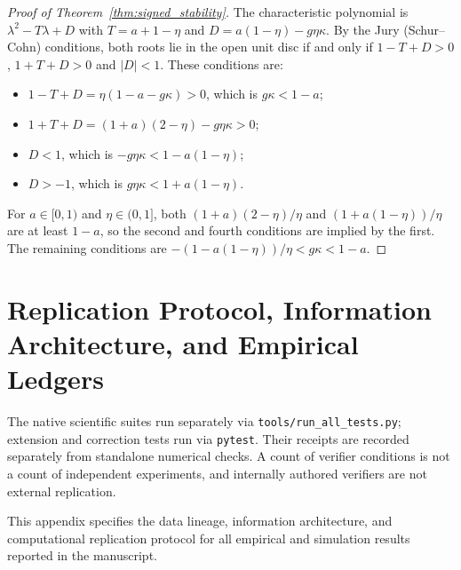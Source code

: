 \documentclass[10pt,twocolumn,letterpaper]{article}
\theoremstyle{definition}
\theoremstyle{remark}
\begin{document}
\begin{proof}[Proof of Theorem~\ref{thm:signed_stability}]
The characteristic polynomial is $\lambda^2-T\lambda+D$ with $T=a+1-\eta$ and $D=a(1-\eta)-g\eta\kappa$. By the Jury (Schur--Cohn) conditions, both roots lie in the open unit disc if and only if $1-T+D>0$, $1+T+D>0$ and $|D|<1$. These conditions are:
\begin{itemize}
 \item $1-T+D=\eta(1-a-g\kappa)>0$, which is $g\kappa<1-a$;
 \item $1+T+D=(1+a)(2-\eta)-g\eta\kappa>0$;
 \item $D<1$, which is $-g\eta\kappa<1-a(1-\eta)$;
 \item $D>-1$, which is $g\eta\kappa<1+a(1-\eta)$.
\end{itemize}
For $a\in[0,1)$ and $\eta\in(0,1]$, both $(1+a)(2-\eta)/\eta$ and $(1+a(1-\eta))/\eta$ are at least $1-a$, so the second and fourth conditions are implied by the first. The remaining conditions are $-(1-a(1-\eta))/\eta<g\kappa<1-a$.
\end{proof}

\section{Replication Protocol, Information Architecture, and Empirical Ledgers}
\label{app:code}
\label{app:replication}
The native scientific suites run separately via \texttt{tools/run\_all\_tests.py}; extension and correction tests run via \texttt{pytest}. Their receipts are recorded separately from standalone numerical checks. A count of verifier conditions is not a count of independent experiments, and internally authored verifiers are not external replication.

This appendix specifies the data lineage, information architecture, and computational replication protocol for all empirical and simulation results reported in the manuscript.
\end{document}
